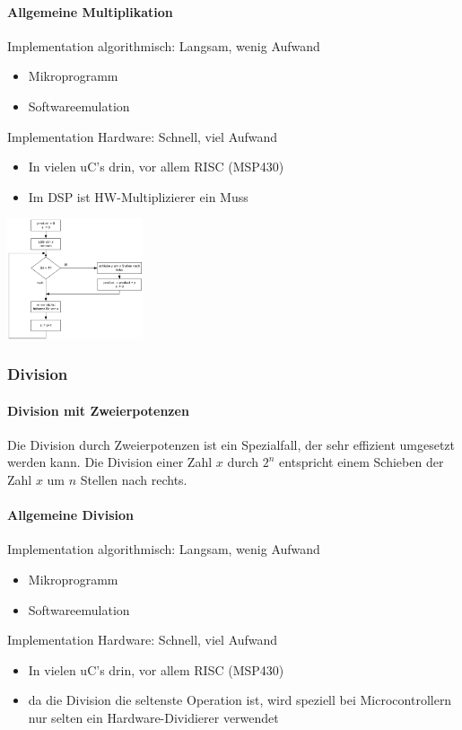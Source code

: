 \paragraph{Allgemeine Multiplikation}
\begin{multicols}{2}
	Implementation algorithmisch: Langsam, wenig Aufwand
	\begin{itemize}
		\item Mikroprogramm
		\item Softwareemulation
	\end{itemize}
	Implementation Hardware: Schnell, viel Aufwand
	\begin{itemize}
		\item In vielen uC's drin, vor allem RISC (MSP430)
		\item Im DSP ist HW-Multiplizierer ein Muss
	\end{itemize}
	\columnbreak
	\includegraphics[width=0.3\textwidth]{images/Arithmetik/Ganzzahlig_Multiplikation}
\end{multicols}

\subsubsection{Division}
\paragraph {Division mit Zweierpotenzen}
Die Division durch Zweierpotenzen ist ein Spezialfall, der sehr effizient umgesetzt werden kann. Die Division einer Zahl $x$ durch $2^n$ entspricht einem Schieben der Zahl $x$ um $n$ Stellen nach rechts.

\paragraph {Allgemeine Division}
Implementation algorithmisch: Langsam, wenig Aufwand
\begin{itemize}
	\item Mikroprogramm
	\item Softwareemulation
\end{itemize}
Implementation Hardware: Schnell, viel Aufwand
\begin{itemize}
	\item In vielen uC's drin, vor allem RISC (MSP430)
	\item da die Division die seltenste Operation ist, wird speziell bei Microcontrollern nur selten ein Hardware-Dividierer verwendet
\end{itemize}


